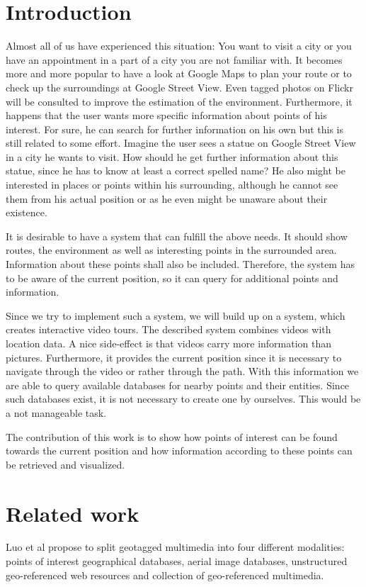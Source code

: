 \documentclass[journal]{IEEEtran}
\begin{document}
\section{Introduction}
Almost all of us have experienced this situation: You want to visit a city or you have an appointment in a part of a city you are not familiar with. It becomes more and more popular to have a look at Google Maps to plan your route or to check up the surroundings at Google Street View. Even tagged photos on Flickr will be consulted to improve the estimation of the environment. Furthermore, it happens that the user wants more specific information about points of his interest. For sure, he can search for further information on his own but this is still related to some effort. Imagine the user sees a statue on Google Street View in a city he wants to visit. How should he get further information about this statue, since he has to know at least a correct spelled name? He also might be interested in places or points within his surrounding, although he cannot see them from his actual position or as he even might be unaware about their existence.

It is desirable to have a system that can fulfill the above needs. It should show routes, the environment as well as interesting points in the surrounded area. Information about these points shall also be included. Therefore, the system has to be aware of the current position, so it can query for additional points and information.

Since we try to implement such a system, we will build up on a system, which creates interactive video tours. The described system combines videos with location data. A nice side-effect is that videos carry more information than pictures. Furthermore, it provides the current position since it is necessary to navigate through the video or rather through the path. With this information we are able to query available databases for nearby points and their entities. Since such databases exist, it is not necessary to create one by ourselves. This would be a not manageable task.

The contribution of this work is to show how points of interest can be found towards the current position and how information according to these points can be retrieved and visualized.


\section{Related work}
Luo et al\cite{geotagging-survey} propose to split geotagged multimedia into four different modalities: points of interest geographical databases, aerial image databases, unstructured geo-referenced web resources and collection of geo-referenced multimedia. 
\end{document}

